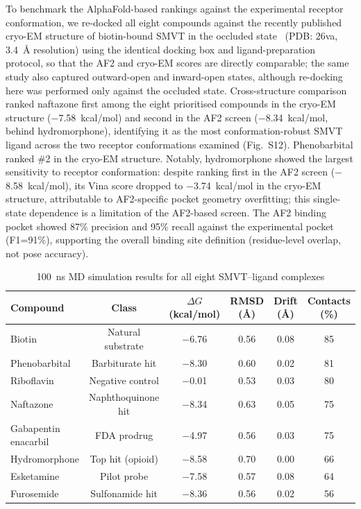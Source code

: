 \documentclass[pdflatex,sn-nature]{sn-jnl}
\begin{document}
To benchmark the AlphaFold-based rankings against the experimental receptor conformation, we re-docked all eight compounds against the recently published cryo-EM structure of biotin-bound SMVT in the occluded state~\cite{zhen2026} (PDB: 26va, 3.4~\AA{} resolution) using the identical docking box and ligand-preparation protocol, so that the AF2 and cryo-EM scores are directly comparable; the same study also captured outward-open and inward-open states, although re-docking here was performed only against the occluded state. Cross-structure comparison ranked naftazone first among the eight prioritised compounds in the cryo-EM structure ($-$7.58~kcal/mol) and second in the AF2 screen ($-$8.34~kcal/mol, behind hydromorphone), identifying it as the most conformation-robust SMVT ligand across the two receptor conformations examined (Fig.~S12). Phenobarbital ranked \#2 in the cryo-EM structure. Notably, hydromorphone showed the largest sensitivity to receptor conformation: despite ranking first in the AF2 screen ($-$8.58~kcal/mol), its Vina score dropped to $-$3.74~kcal/mol in the cryo-EM structure, attributable to AF2-specific pocket geometry overfitting; this single-state dependence is a limitation of the AF2-based screen. The AF2 binding pocket showed 87\% precision and 95\% recall against the experimental pocket (F1=91\%), supporting the overall binding site definition (residue-level overlap, not pose accuracy).

\begin{table}[t]
\centering
\caption{100~ns MD simulation results for all eight SMVT--ligand complexes}
\label{tab:md}
\footnotesize
\begin{tabular}{lccccc}
\toprule
Compound & Class & $\Delta G$ (kcal/mol) & RMSD (\AA{}) & Drift (\AA{}) & Contacts (\%) \\
\midrule
Biotin & Natural substrate & $-$6.76 & 0.56 & 0.08 & 85 \\
Phenobarbital & Barbiturate hit & $-$8.30 & 0.60 & 0.02 & 81 \\
Riboflavin & Negative control & $-$0.01 & 0.53 & 0.03 & 80 \\
Naftazone & Naphthoquinone hit & $-$8.34 & 0.63 & 0.05 & 75 \\
Gabapentin enacarbil & FDA prodrug & $-$4.97 & 0.56 & 0.03 & 75 \\
Hydromorphone & Top hit (opioid) & $-$8.58 & 0.70 & 0.00 & 66 \\
Esketamine & Pilot probe & $-$7.58 & 0.57 & 0.08 & 64 \\
Furosemide & Sulfonamide hit & $-$8.36 & 0.56 & 0.02 & 56 \\
\bottomrule
\end{tabular}
\end{table}
\end{document}
